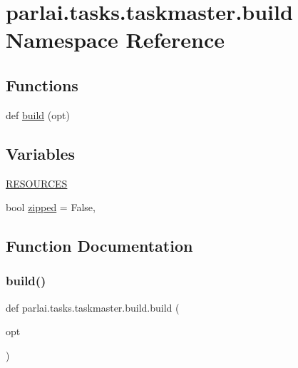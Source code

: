 \hypertarget{namespaceparlai_1_1tasks_1_1taskmaster_1_1build}{}\section{parlai.\+tasks.\+taskmaster.\+build Namespace Reference}
\label{namespaceparlai_1_1tasks_1_1taskmaster_1_1build}
\subsection*{Functions}
\begin{DoxyCompactItemize}
\item 
def \hyperlink{namespaceparlai_1_1tasks_1_1taskmaster_1_1build_a9a432c354754067775ff8c419e2e4ffe}{build} (opt)
\end{DoxyCompactItemize}
\subsection*{Variables}
\begin{DoxyCompactItemize}
\item 
\hyperlink{namespaceparlai_1_1tasks_1_1taskmaster_1_1build_ab4e1e1aa4bfa24c0ffbafacab10c4da3}{R\+E\+S\+O\+U\+R\+C\+ES}
\item 
bool \hyperlink{namespaceparlai_1_1tasks_1_1taskmaster_1_1build_a28d7bb8bf45ebbf6d20c29488824e2ac}{zipped} = False,
\end{DoxyCompactItemize}


\subsection{Function Documentation}
\mbox{\label{namespaceparlai_1_1tasks_1_1taskmaster_1_1build_a9a432c354754067775ff8c419e2e4ffe}} 
\subsubsection{\texorpdfstring{build()}{build()}}
{\footnotesize\ttfamily def parlai.\+tasks.\+taskmaster.\+build.\+build (\begin{DoxyParamCaption}\item[{}]{opt }\end{DoxyParamCaption})}



